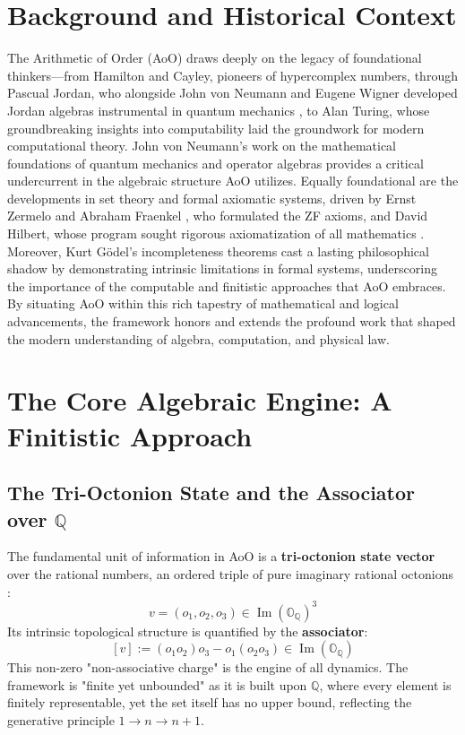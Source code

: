 \documentclass[11pt, a4paper]{article}
\theoremstyle{definition}
\theoremstyle{remark}
\newcommand{\Q}{\mathbb{Q}}
\newcommand{\OQ}{\mathbb{O}_{\mathbb{Q}}}
\begin{document}
\section{Background and Historical Context}
The Arithmetic of Order (AoO) draws deeply on the legacy of foundational thinkers—from Hamilton and Cayley, pioneers of hypercomplex numbers, through Pascual Jordan, who alongside John von Neumann and Eugene Wigner developed Jordan algebras instrumental in quantum mechanics \cite{JvNW1934}, to Alan Turing, whose groundbreaking insights into computability laid the groundwork for modern computational theory. John von Neumann's work on the mathematical foundations of quantum mechanics \cite{vN1932} and operator algebras provides a critical undercurrent in the algebraic structure AoO utilizes. Equally foundational are the developments in set theory and formal axiomatic systems, driven by Ernst Zermelo \cite{Zermelo1908} and Abraham Fraenkel \cite{Fraenkel1922}, who formulated the ZF axioms, and David Hilbert, whose program sought rigorous axiomatization of all mathematics \cite{Hilbert1899}. Moreover, Kurt Gödel's incompleteness theorems \cite{Godel1931} cast a lasting philosophical shadow by demonstrating intrinsic limitations in formal systems, underscoring the importance of the computable and finitistic approaches that AoO embraces. By situating AoO within this rich tapestry of mathematical and logical advancements, the framework honors and extends the profound work that shaped the modern understanding of algebra, computation, and physical law.

\section{The Core Algebraic Engine: A Finitistic Approach}

\subsection{The Tri-Octonion State and the Associator over $\Q$}
The fundamental unit of information in AoO is a \textbf{tri-octonion state vector} over the rational numbers, an ordered triple of pure imaginary rational octonions \cite{EK2025b}:
\[ v = (o_1, o_2, o_3) \in \operatorname{Im}(\OQ)^3 \]
Its intrinsic topological structure is quantified by the \textbf{associator}:
\[ [v] := (o_1 o_2) o_3 - o_1 (o_2 o_3) \in \operatorname{Im}(\OQ) \]
This non-zero "non-associative charge" is the engine of all dynamics. The framework is "finite yet unbounded" as it is built upon $\Q$, where every element is finitely representable, yet the set itself has no upper bound, reflecting the generative principle $1 \to n \to n+1$.
\end{document}
